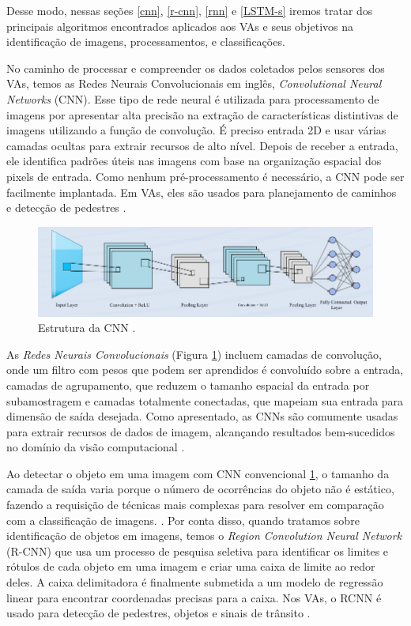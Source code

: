 Desse modo, nessas seções \ref{cnn}, \ref{r-cnn}, \ref{rnn} e \ref{LSTM-s} iremos tratar dos principais algoritmos encontrados aplicados aos VAs e seus objetivos na identificação de imagens, processamentos, e classificações.

 \label{cnn}

No caminho de processar e compreender os dados coletados pelos sensores dos VAs, temos as Redes Neurais Convolucionais em inglês, \textit{Convolutional Neural Networks} (CNN). Esse tipo de rede neural é utilizada para processamento de imagens por apresentar alta precisão na extração de características distintivas de imagens utilizando a função de convolução. É preciso entrada 2D e usar várias camadas ocultas para extrair recursos de alto nível. Depois de receber a entrada, ele identifica padrões úteis nas imagens com base na organização espacial dos pixels de entrada. Como nenhum pré-processamento é necessário, a CNN pode ser facilmente implantada. Em VAs, eles são usados para planejamento de caminhos e detecção de pedestres \cite{review-auto}.

\begin{figure}[H]
\centering
\includegraphics[width=\textwidth]{Figures/CNN.png}
\caption{Estrutura da CNN \cite{software-cnn}.}
\label{CNN}
\end{figure}

As \textit{Redes Neurais Convolucionais} (Figura \ref{CNN}) incluem camadas de convolução, onde um filtro com pesos que podem ser aprendidos é convoluído sobre a entrada, camadas de agrupamento, que reduzem o tamanho espacial da entrada por subamostragem e camadas totalmente conectadas, que mapeiam sua entrada para dimensão de saída desejada. Como apresentado, as CNNs são comumente usadas para extrair recursos de dados de imagem, alcançando resultados bem-sucedidos no domínio da visão computacional \cite{software-review}.

 \label{r-cnn}

Ao detectar o objeto em uma imagem com CNN convencional \ref{CNN}, o tamanho da camada de saída varia porque o número de ocorrências do objeto não é estático, fazendo a requisição de técnicas mais complexas para resolver em comparação com a classificação de imagens. \cite{software-cnn}.
Por conta disso, quando tratamos sobre identificação de objetos em imagens, temos o \textit{Region Convolution Neural Network} (R-CNN) que usa um processo de pesquisa seletiva para identificar os limites e rótulos de cada objeto em uma imagem e criar uma caixa de limite ao redor deles. A caixa delimitadora é finalmente submetida a um modelo de regressão linear para encontrar coordenadas precisas para a caixa. Nos VAs, o RCNN é usado para detecção de pedestres, objetos e sinais de trânsito \cite{review-auto}.


